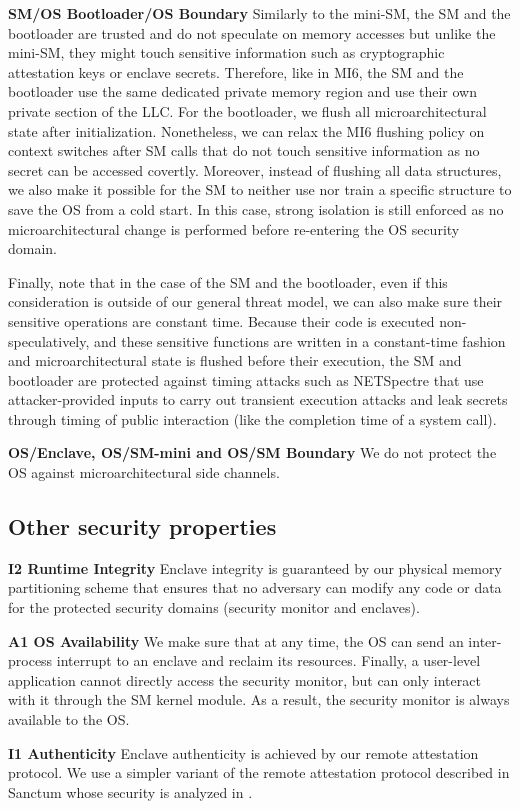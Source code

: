 \textbf{SM/OS Bootloader/OS Boundary}
Similarly to the mini-SM, the SM and the bootloader are trusted and do not speculate on memory accesses but unlike the mini-SM, they might touch sensitive information such as cryptographic attestation keys or enclave secrets.
Therefore, like in MI6, the SM and the bootloader use the same dedicated private memory region and use their own private section of the LLC.
For the bootloader, we flush all microarchitectural state after initialization.
Nonetheless, we can relax the MI6 flushing policy on context switches after SM calls that do not touch sensitive information as no secret can be accessed covertly.
Moreover, instead of flushing all data structures, we also make it possible for the SM to neither use nor train a specific structure to save the OS from a cold start.
In this case, strong isolation is still enforced as no microarchitectural change is performed before re-entering the OS security domain.

Finally, note that in the case of the SM and the bootloader, even if this consideration is outside of our general threat model, we can also make sure their sensitive operations are constant time.
Because their code is executed non-speculatively, and these sensitive functions are written in a constant-time fashion and microarchitectural state is flushed before their execution, the SM and bootloader are protected against timing attacks such as NETSpectre \cite{schwarz2019netspectre} that use attacker-provided inputs to carry out transient execution attacks and leak secrets through timing of public interaction (like the completion time of a system call).

\textbf{OS/Enclave, OS/SM-mini and OS/SM Boundary}
We do not protect the OS against microarchitectural side channels.

\subsection{Other security properties}

\textbf{I2 Runtime Integrity}
Enclave integrity is guaranteed by our physical memory partitioning scheme that ensures that no adversary can modify any code or data for the protected security domains (security monitor and enclaves).

\textbf{A1 OS Availability}
We make sure that at any time, the OS can send an inter-process interrupt to an enclave and reclaim its resources.
Finally, a user-level application cannot directly access the security monitor, but can only interact with it through the SM kernel module.
As a result, the security monitor is always available to the OS.

\textbf{I1 Authenticity}
Enclave authenticity is achieved by our remote attestation protocol.
We use a simpler variant of the remote attestation protocol described in Sanctum \cite{costan2016sanctum} whose security is analyzed in \cite{lebedev2018secure}.
